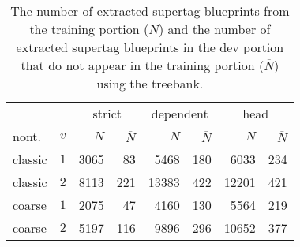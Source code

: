 \documentclass[../../document.tex]{subfiles}
\begin{document}
    \subsection{}
    \begin{table}
        \caption{\label{tbl:experiments:tiger:size}
        The number of extracted supertag blueprints from the training portion ($N$) and the number of extracted supertag blueprints in the dev portion that do not appear in the training portion ($\overline{N}$) using the \tiger{} treebank.
        }
        \centering
        \setlength{\tabcolsep}{4pt}
        \vspace{.2cm}
        \begin{tabular}{lc|rr|rr|rr}
            \toprule     
            &        & \multicolumn{2}{c|}{strict} & \multicolumn{2}{c|}{dependent} & \multicolumn{2}{c}{head}  \\
  nont.   &\(v\)   & $N$ & $\overline{N}$ & $N$ & $\overline{N}$ & $N$ & $\overline{N}$ \\ \hline
   classic & \(1\)  & 3065 &  83 &  5468 & 180 &  6033 & 234  \\
   classic & \(2\)  & 8113 & 221 & 13383 & 422 & 12201 & 421   \\
   coarse  & \(1\)  & 2075 &  47 &  4160 & 130 &  5564 & 219      \\
   coarse  & \(2\)  & 5197 & 116 &  9896 & 296 & 10652 & 377  \\
    \bottomrule
        \end{tabular}
    \end{table}
\end{document}
